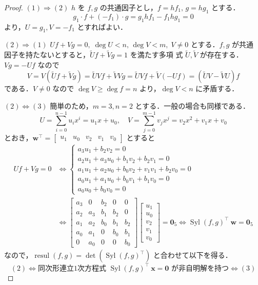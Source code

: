 \documentclass[12pt, uplatex, dvipdfmx]{jsarticle}
\theoremstyle{definition}
\DeclareMathOperator{\Syl}{Syl}
\DeclareMathOperator{\resul}{resul}
\begin{document}
\begin{proof}
  $(1) \Rightarrow (2)$ $h$ を $f,g$ の共通因子とし，$f=hf_1, \,
  g=hg_1$ とする．
  \[
    g_1 \cdot f + (-f_1) \cdot g = g_1  hf_1 - f_1 hg_1 = 0
  \]
  より，$U=g_1, V=-f_1$ とすればよい．

  $(2) \Rightarrow (1)$
  $Uf+Vg=0, \; \deg U<n, \, \deg V<m, \; V \neq 0$ とする．$f,g$ が共通
  因子を持たないとすると，$\tilde{U}f+\tilde{V}g=1$ を満たす多項
  式 $\tilde{U}, \tilde{V}$ が存在する．$Vg = -Uf$ なので
  \[
    V = V(\tilde{U}f+\tilde{V}g) = \tilde{U}Vf + \tilde{V}Vg = \tilde{U}Vf + \tilde{V}(-Uf) = (\tilde{U}V - \tilde{V}U)f
  \]
  である．$V \neq 0$ なので $\deg V \geq \deg f = n$ より，$\deg V <n$ に矛盾する．

  $(2) \Leftrightarrow (3)$ 簡単のため，$m=3, n=2$
  とする．一般の場合も同様である．
  \[
    U= \sum_{i=0}^{n-1} u_i x^i=u_1 x + u_0, \quad V= \sum_{j=0}^{m-1} v_j x^j=v_2 x^2+v_1 x + v_0
  \]
  とおき，$\bm{w}^{\top} = \left[
    \begin{array}{ccccc}
      u_1 & u_0 & v_2 & v_1 & v_0
    \end{array}
    \right]$ とすると
  \[
    \begin{aligned}
      Uf+Vg=0 &\Leftrightarrow
      \begin{cases}
        a_3u_1 + b_2v_2=0\\
        a_2u_1+a_3u_0+b_1v_2+b_2v_1=0\\
        a_1u_1+a_2u_0+b_0v_2+v_1v_1+b_2v_0=0\\
        a_0u_1+a_1u_0+b_0v_1+b_1v_0=0\\
        a_0u_0+b_0v_0=0
      \end{cases}\\
      & \Leftrightarrow \left[
        \begin{array}{ccccc}
          a_3 & 0 & b_2 & 0 & 0\\
          a_2 & a_3 & b_1 & b_2 & 0\\
          a_1 & a_2 & b_0 & b_1 & b_2\\
          a_0 & a_1 & 0 & b_0 & b_1\\
          0 & a_0 & 0 & 0 & b_0
        \end{array}
      \right] \left[
        \begin{array}{c}
          u_1\\
          u_0\\
          v_2\\
          v_1\\
          v_0
        \end{array}
      \right] = \bm{0}_5
      \Leftrightarrow \Syl(f,g)^{\top} ~\bm{w}= \bm{0}_5
    \end{aligned}
  \]
  なので，$\resul(f,g) = \det\left(\Syl(f,g)^{\top}\right)$ と合わせて以下を得る．
  \[
    (2) \Leftrightarrow \text{同次形連立1次方程式 } \Syl(f,g)^{\top}~\bm{x}=\bm{0} \text{ が非自明解を持つ}
    \Leftrightarrow (3)
  \]
\end{proof}
\end{document}
